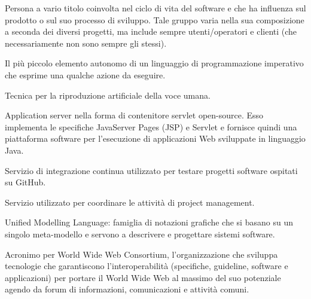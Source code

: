 \item[stakeholder] Persona a vario titolo coinvolta nel ciclo di vita del software e che ha influenza sul prodotto o sul suo processo di sviluppo. Tale gruppo varia nella sua composizione a seconda dei diversi progetti, ma include sempre utenti/operatori e clienti (che necessariamente non sono sempre gli stessi).
\item[statement] Il più piccolo elemento autonomo di un linguaggio di programmazione imperativo che esprime una qualche azione da eseguire.
\item[text-to-speech] Tecnica per la riproduzione artificiale della voce umana.
\item[Tomcat] Application server nella forma di contenitore servlet open-source. Esso implementa le specifiche JavaServer Pages (JSP) e Servlet e fornisce quindi una piattaforma software per l'esecuzione di applicazioni Web sviluppate in linguaggio Java.
\item[Travis] Servizio di integrazione continua utilizzato per testare progetti software ospitati su GitHub.
\item[Trello] Servizio utilizzato per coordinare le attività di project management.
\item[UML] Unified Modelling Language: famiglia di notazioni grafiche che si basano su un singolo meta-modello e servono a descrivere e progettare sistemi software.
\item[W3C] Acronimo per World Wide Web Consortium, l'organizzazione che sviluppa tecnologie che garantiscono l'interoperabilità (specifiche, guideline, software e applicazioni) per portare il World Wide Web al massimo del suo potenziale agendo da forum di informazioni, comunicazioni e attività comuni. 
